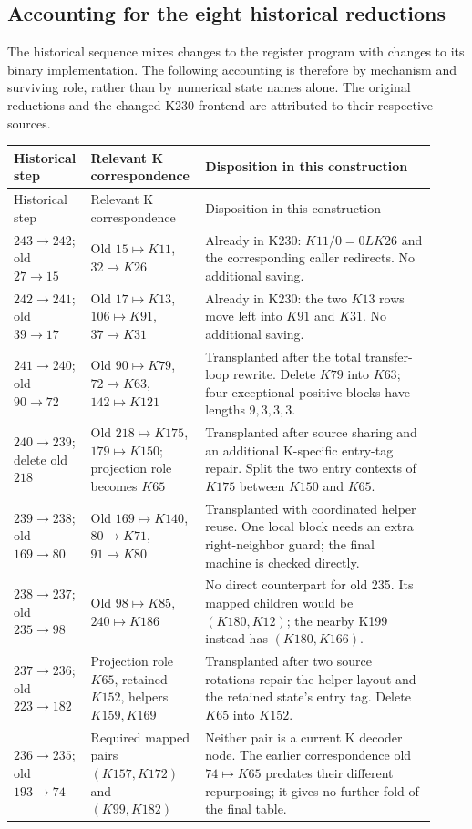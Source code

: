 \subsection{Accounting for the eight historical reductions}

The historical sequence mixes changes to the register program with changes
to its binary implementation.  The following accounting is therefore by
mechanism and surviving role, rather than by numerical state names alone.
The original reductions and the changed K230 frontend are attributed to
their respective sources.\cite{proveit235,k230}

\begingroup
\small
\renewcommand{\arraystretch}{1.12}
\begin{longtable}{@{}p{0.16\linewidth}p{0.23\linewidth}p{0.53\linewidth}@{}}
\toprule
Historical step & Relevant K correspondence & Disposition in this construction\\
\midrule
\endfirsthead
\toprule
Historical step & Relevant K correspondence & Disposition in this construction\\
\midrule
\endhead
\bottomrule
\endfoot
$243\to242$; old $27\to15$
& Old $15\mapsto K11$, $32\mapsto K26$
& Already in K230: $K11/0=0LK26$ and the corresponding caller redirects.
No additional saving.\\
$242\to241$; old $39\to17$
& Old $17\mapsto K13$, $106\mapsto K91$, $37\mapsto K31$
& Already in K230: the two $K13$ rows move left into $K91$ and $K31$.
No additional saving.\\
$241\to240$; old $90\to72$
& Old $90\mapsto K79$, $72\mapsto K63$, $142\mapsto K121$
& Transplanted after the total transfer-loop rewrite. Delete $K79$ into
$K63$; four exceptional positive blocks have lengths $9,3,3,3$.\\
$240\to239$; delete old $218$
& Old $218\mapsto K175$, $179\mapsto K150$; projection role becomes $K65$
& Transplanted after source sharing and an additional K-specific entry-tag
repair. Split the two entry contexts of $K175$ between $K150$ and $K65$.\\
$239\to238$; old $169\to80$
& Old $169\mapsto K140$, $80\mapsto K71$, $91\mapsto K80$
& Transplanted with coordinated helper reuse. One local block needs an
extra right-neighbor guard; the final machine is checked directly.\\
$238\to237$; old $235\to98$
& Old $98\mapsto K85$, $240\mapsto K186$
& No direct counterpart for old 235. Its mapped children would be
$(K180,K12)$; the nearby K199 instead has $(K180,K166)$.\\
$237\to236$; old $223\to182$
& Projection role $K65$, retained $K152$, helpers $K159,K169$
& Transplanted after two source rotations repair the helper layout and
the retained state's entry tag. Delete $K65$ into $K152$.\\
$236\to235$; old $193\to74$
& Required mapped pairs $(K157,K172)$ and $(K99,K182)$
& Neither pair is a current K decoder node. The earlier correspondence
old $74\mapsto K65$ predates their different repurposing; it gives no
further fold of the final table.\\
\end{longtable}
\endgroup

